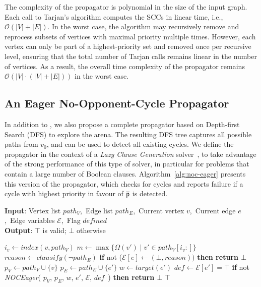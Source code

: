 \documentclass[a4paper,fleqn]{cas-sc}
\begin{document}
The complexity of the \nocchecker propagator is polynomial in the size of the input graph. Each call to Tarjan's algorithm computes the SCCs in linear time, i.e., $\mathcal{O}(|V| + |E|)$. In the worst case, the algorithm may recursively remove and reprocess subsets of vertices with maximal priority multiple times. However, each vertex can only be part of a highest-priority set and removed once per recursive level, ensuring that the total number of Tarjan calls remains linear in the number of vertices. As a result, the overall time complexity of the propagator remains $\mathcal{O}(|V| \cdot (|V| + |E|))$ in the worst case.

\subsection{An Eager No-Opponent-Cycle Propagator} \label{sec:nocfilter}
In addition to \nocchecker, we also propose a complete propagator based on Depth-first Search (DFS) to explore the arena. The resulting DFS tree captures all possible paths from $v_0$, and can be used to detect all existing cycles. We define the propagator in the context of a \textit{Lazy Clause Generation} solver~\citep{DBLP:journals/constraints/OhrimenkoSC09}, to take advantage of the strong performance of this type of solver, in particular for problems that contain a large number of Boolean clauses. Algorithm~\ref{alg:noc-eager} presents this version of the propagator, which checks for cycles and reports failure if a cycle with highest priority in favour of $\overline{\mathsf{p}}$ is detected.

\begin{algorithm}[htb]
\small
\caption{\textbf{\textit{NOCEager}}}
\textbf{Input}: Vertex list $path_V$,\ Edge list $path_E$,\ Current vertex $v$,\ Current edge $e$,\ Edge variables $\mathcal{E}$,\ Flag $\textit{defined}$ \\
\textbf{Output}: $\top$ is valid; $\bot$ otherwise
\begin{algorithmic}[1]
     \label{alg:noc-eager:pathcheck}
        \STATE $i_v \gets \textit{index}(v, path_V)$
        \STATE $m \gets \max\{\Omega(v') \mid v' \in path_V[i_v:]\}$
         \label{alg:noc-eager:checkopponent}
            \STATE $\textit{reason} \gets \textit{clausify}(\neg path_E)$ \label{alg:noc-eager:reason}
            \STATE \textbf{if }not ($\mathcal{E}[e] \gets (\bot, \textit{reason}))$ \textbf{then return $\bot$}
        \ENDIF
     \label{alg:noc-eager:defcheck}
         \label{alg:no-opponent-cycle-f1:edgecheck}
            \STATE $p_V \gets path_V \cup \{v\}$
            \STATE $p_E \gets path_E \cup \{e'\}$
            \STATE $w \gets \textit{target}(e')$
            \STATE $\textit{def} \gets \mathcal{E}[e'] = \top$
            \STATE \textbf{if }not \textit{NOCEager}(
                $p_V$,
                $p_E$,
                $w$,
                $e'$,
                $\mathcal{E}$,
                $\textit{def}$\ ) \textbf{then return $\bot$}
        \ENDFOR
    \ENDIF
    \RETURN $\top$
\end{algorithmic}
\label{alg:noc-eager}
\end{algorithm}
\end{document}
